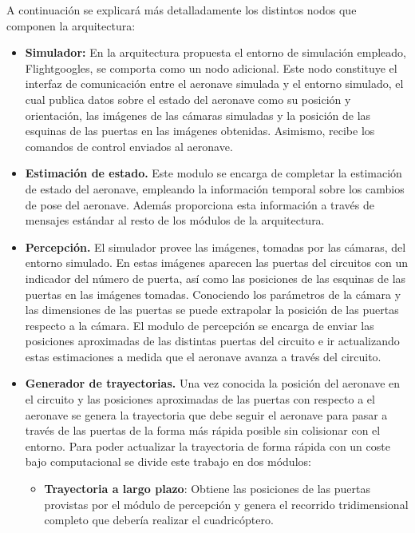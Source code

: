 A continuación se explicará más detalladamente los distintos nodos que componen la arquitectura:
\begin{itemize}
	
	\item \textbf{Simulador:} En la arquitectura propuesta el entorno de simulación empleado, Flightgoogles, se comporta como un nodo adicional. Este nodo constituye el interfaz de comunicación entre el aeronave simulada y el entorno simulado,
	el cual publica datos sobre el estado del aeronave como su posición y orientación, las imágenes de las cámaras simuladas y la posición de las esquinas de las puertas en las imágenes obtenidas. Asimismo, recibe los comandos de control enviados al aeronave.
	 
	\item \textbf{Estimación de estado.} Este modulo se encarga de completar la estimación de estado del aeronave, empleando la información temporal sobre los cambios de pose del aeronave. Además proporciona esta información a través de mensajes estándar al resto de los módulos de la arquitectura.
	
	\item \textbf{Percepción.} El simulador provee las imágenes, tomadas por las cámaras, del entorno simulado. En estas imágenes aparecen las puertas del circuitos con un indicador del número de puerta, así como las posiciones de las esquinas de las puertas en las imágenes tomadas. Conociendo los parámetros de la cámara y las dimensiones de las puertas se puede extrapolar la posición de las puertas respecto a la cámara. El modulo de percepción se encarga de enviar las posiciones aproximadas de las distintas puertas del circuito e ir actualizando estas estimaciones a medida que el aeronave avanza a través del circuito.
	
	\item \textbf{Generador de trayectorias.} Una vez conocida la posición del aeronave en el circuito y las posiciones aproximadas de las puertas con respecto a el aeronave se genera la trayectoria que debe seguir el aeronave para pasar a través de las puertas de la forma más rápida posible sin colisionar con el entorno. Para poder actualizar la trayectoria de forma rápida con un coste bajo computacional se divide este trabajo en dos módulos:
	
	\begin{itemize}
		\item \textbf{Trayectoria a largo plazo}: Obtiene las posiciones de las puertas provistas por el módulo de percepción y genera el recorrido tridimensional completo que debería realizar el cuadricóptero. 
		

\end{itemize}
\end{itemize}
